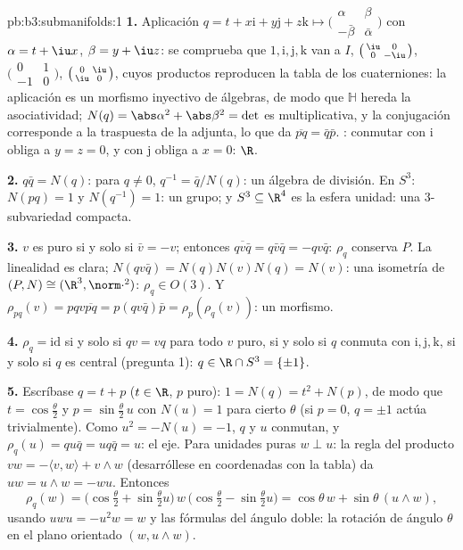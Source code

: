 \begin{solution}{pb:b3:submanifolds:1}
\textbf{1.} Aplicación $q = t + x\mathrm i + y\mathrm j + z\mathrm k
\mapsto \bigl(\begin{smallmatrix}\alpha & \beta\\ -\bar\beta
& \bar\alpha\end{smallmatrix}\bigr)$ con $\alpha = t + \iu
x$, $\beta = y + \iu z$: se comprueba que $1, \mathrm i,
\mathrm j, \mathrm k$ van a $I$, $\bigl(\begin{smallmatrix}
\iu & 0\\ 0 & -\iu\end{smallmatrix}\bigr)$,
$\bigl(\begin{smallmatrix}0 & 1\\ -1 &
0\end{smallmatrix}\bigr)$, $\bigl(\begin{smallmatrix}0 &
\iu\\ \iu & 0\end{smallmatrix}\bigr)$, cuyos productos reproducen la
tabla de los cuaterniones: la aplicación es un morfismo inyectivo de
álgebras, de modo que $\mathbb H$ hereda la asociatividad;
$N(q) = \abs\alpha^2 + \abs\beta^2 = \det$ es multiplicativa, y la
conjugación corresponde a la traspuesta de la adjunta, lo que da
$\overline{pq} = \bar q\bar p$. :
conmutar con $\mathrm i$ obliga a $y = z = 0$, y con $\mathrm j$ obliga
a
$x = 0$: $\R$.

\textbf{2.} $q\bar q = N(q)$: para $q \neq 0$, $q^{-1} = \bar
q/N(q)$: un álgebra de división. En $S^3$: $N(pq) = 1$ y
$N(q^{-1}) = 1$: un grupo; y $S^3 \subseteq \R^4$ es la esfera unidad:
una $3$-subvariedad compacta.

\textbf{3.} $v$ es puro si y solo si $\bar v = -v$; entonces
$\overline{qv\bar q} = q\bar v\bar q = -qv\bar q$: $\rho_q$
conserva $P$. La linealidad es clara; $N(qv\bar q) =
N(q)N(v)N(q) = N(v)$: una isometría de $(P, N) \cong (\R^3,
\norm\cdot^2)$: $\rho_q \in O(3)$. Y $\rho_{pq}(v) =
pqv\overline{pq} = p(qv\bar q)\bar p =
\rho_p(\rho_q(v))$: un morfismo.

\textbf{4.} $\rho_q = \mathrm{id}$ si y solo si $qv = vq$ para todo $v$
puro, si y solo si $q$ conmuta con $\mathrm i, \mathrm j, \mathrm k$, si
y solo si $q$ es central (pregunta 1): $q \in \R\cap S^3 =
\{\pm1\}$.

\textbf{5.} Escríbase $q = t + p$ ($t \in \R$, $p$ puro): $1 =
N(q) = t^2 + N(p)$, de modo que $t = \cos\frac\theta2$ y $p =
\sin\frac\theta2\,u$ con $N(u) = 1$ para cierto $\theta$ (si $p = 0$,
$q = \pm1$ actúa trivialmente). Como $u^2 = -N(u)
= -1$, $q$ y $u$ conmutan, y $\rho_q(u) = qu\bar q =
uq\bar q = u$: el eje. Para unidades puras $w \perp u$: la regla del
producto $vw = -\langle v, w\rangle + v\wedge w$ (desarróllese en
coordenadas con la tabla) da $uw = u\wedge w
= -wu$. Entonces
\[
\rho_q(w) = \bigl(\cos\tfrac\theta2 +
\sin\tfrac\theta2u\bigr)\,w\,\bigl(\cos\tfrac\theta2 -
\sin\tfrac\theta2u\bigr)
= \cos\theta\,w + \sin\theta\,(u\wedge w),
\]
usando $uwu = -u^2w = w$ y las fórmulas del ángulo doble: la rotación de
ángulo $\theta$ en el plano orientado $(w,
u\wedge w)$.


\end{solution}

